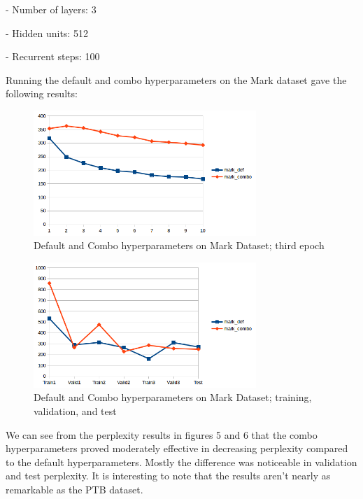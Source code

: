 \documentclass[10pt,a4paper]{article}
\begin{document}
- Number of layers: 3


- Hidden units: 512


- Recurrent steps: 100


Running the default and combo hyperparameters on the Mark dataset gave the following results:



\begin{figure}[H]
  \begin{center}
    \includegraphics[width=0.75\textwidth] {mark1.png}
    \caption{Default and Combo hyperparameters on Mark Dataset; third epoch}
  \end{center}
\end{figure}

\begin{figure}[H]
  \begin{center}
    \includegraphics[width=0.75\textwidth] {mark2.png}
    \caption{Default and Combo hyperparameters on Mark Dataset; training, validation, and test}
  \end{center}
\end{figure}

We can see from the perplexity results in figures 5 and 6 that the combo hyperparameters proved moderately effective in decreasing perplexity compared to the default hyperparameters. Mostly the difference was noticeable in validation and test perplexity. It is interesting to note that the results aren't nearly as remarkable as the PTB dataset.
\end{document}
